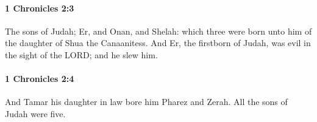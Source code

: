 		\paragraph{1 Chronicles 2:3} %
			\label{1CHRONICLES-2-3}

			The sons of Judah; Er, and Onan, and Shelah: which three were born unto him of the daughter of Shua the Canaanitess. And Er, the firstborn of Judah, was evil in the sight of the LORD; and he slew him.


		\paragraph{1 Chronicles 2:4} %
			\label{1CHRONICLES-2-4}

			And Tamar his daughter in law bore him Pharez and Zerah. All the sons of Judah were five.



